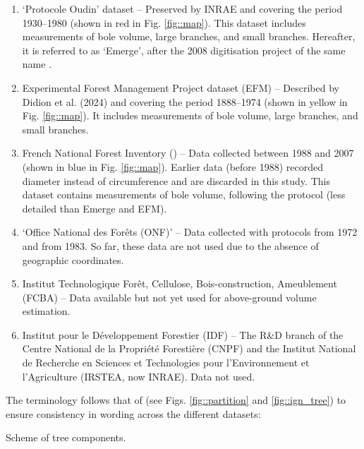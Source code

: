 \begin{enumerate}
	\item `Protocole Oudin' dataset -- Preserved by INRAE and covering the period 1930--1980 (shown in red in Fig. \ref{fig::map}). This dataset includes measurements of bole volume, large branches, and small branches. Hereafter, it is referred to as `Emerge', after the 2008 digitisation project of the same name \parencite{Deleuze2013}.
	\item Experimental Forest Management Project dataset (EFM) -- Described by Didion et al. (2024) and covering the period 1888--1974 (shown in yellow in Fig. \ref{fig::map}). It includes measurements of bole volume, large branches, and small branches.
	\item French National Forest Inventory (\NFI) -- Data collected between 1988 and 2007 (shown in blue in Fig. \ref{fig::map}). Earlier data (before 1988) recorded diameter instead of circumference and are discarded in this study. This dataset contains measurements of bole volume, following the \NFI{} protocol (less detailed than Emerge and EFM).
	\item `Office National des Forêts (ONF)' -- Data collected with protocols from 1972 and from 1983. So far, these data are not used due to the absence of geographic coordinates.
	\item Institut Technologique Forêt, Cellulose, Bois-construction, Ameublement (FCBA) -- Data available but not yet used for above-ground volume estimation.
	\item Institut pour le Développement Forestier (IDF) -- The R\&D branch of the Centre National de la Propriété Forestière (CNPF) and the Institut National de Recherche en Sciences et Technologies pour l'Environnement et l'Agriculture (IRSTEA, now INRAE). Data not used.
\end{enumerate}

The terminology follows that of \cite{Gschwantner2009} (see Figs. \ref{fig::partition} and \ref{fig::ign_tree}) to ensure consistency in wording across the different datasets:

\begin{marginfigure}
	
	\caption{Scheme of tree components.\label{fig::ign_tree}}
\end{marginfigure}

